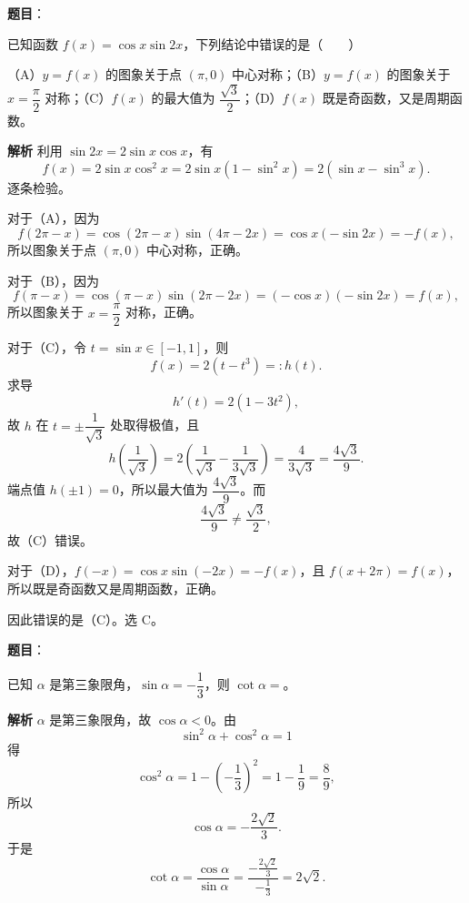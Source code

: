 \begin{answer}

\textbf{题目}：

已知函数 $f(x)=\cos x\sin2x$，下列结论中错误的是\mbox{（　　）}

（A）$y=f(x)$ 的图象关于点 $(\pi,0)$ 中心对称；（B）$y=f(x)$ 的图象关于 $x=\dfrac\pi2$ 对称；（C）$f(x)$ 的最大值为 $\dfrac{\sqrt3}2$；（D）$f(x)$ 既是奇函数，又是周期函数。

\textbf{解析}
利用 $\sin2x=2\sin x\cos x$，有
\nopagebreak[4]
\[f(x)=2\sin x\cos^2x
=2\sin x(1-\sin^2x)
=2(\sin x-\sin^3x).\]
逐条检验。

对于（A），因为
\nopagebreak[4]
\[f(2\pi-x)=\cos(2\pi-x)\sin(4\pi-2x)
=\cos x(-\sin2x)=-f(x),\]
所以图象关于点 $(\pi,0)$ 中心对称，正确。

对于（B），因为
\nopagebreak[4]
\[f(\pi-x)=\cos(\pi-x)\sin(2\pi-2x)
=(-\cos x)(-\sin2x)=f(x),\]
所以图象关于 $x=\dfrac\pi2$ 对称，正确。

对于（C），令 $t=\sin x\in[-1,1]$，则
\nopagebreak[4]
\[f(x)=2(t-t^3)=:h(t).\]
求导
\nopagebreak[4]
\[h'(t)=2(1-3t^2),\]
故 $h$ 在 $t=\pm\dfrac1{\sqrt3}$ 处取得极值，且
\nopagebreak[4]
\[h\left(\frac1{\sqrt3}\right)
=2\left(\frac1{\sqrt3}-\frac1{3\sqrt3}\right)
=\frac4{3\sqrt3}
=\frac{4\sqrt3}{9}.\]
端点值 $h(\pm1)=0$，所以最大值为 $\dfrac{4\sqrt3}{9}$。而
\nopagebreak[4]
\[\frac{4\sqrt3}{9}\neq\frac{\sqrt3}{2},\]
故（C）错误。

对于（D），$f(-x)=\cos x\sin(-2x)=-f(x)$，且 $f(x+2\pi)=f(x)$，所以既是奇函数又是周期函数，正确。

因此错误的是（C）。选 C。


\end{answer}
\begin{answer}

\textbf{题目}：

已知 $\alpha$ 是第三象限角，$\sin\alpha=-\dfrac13$，则 $\cot\alpha=$\gkblank{}。

\textbf{解析}
$\alpha$ 是第三象限角，故 $\cos\alpha<0$。由
\nopagebreak[4]
\[\sin^2\alpha+\cos^2\alpha=1\]
得
\nopagebreak[4]
\[\cos^2\alpha=1-\left(-\frac13\right)^2
=1-\frac19=\frac89,\]
所以
\nopagebreak[4]
\[\cos\alpha=-\frac{2\sqrt2}{3}.\]
于是
\nopagebreak[4]
\[\cot\alpha=\frac{\cos\alpha}{\sin\alpha}
=\frac{-\frac{2\sqrt2}{3}}{-\frac13}
=2\sqrt2.\]


\end{answer}
